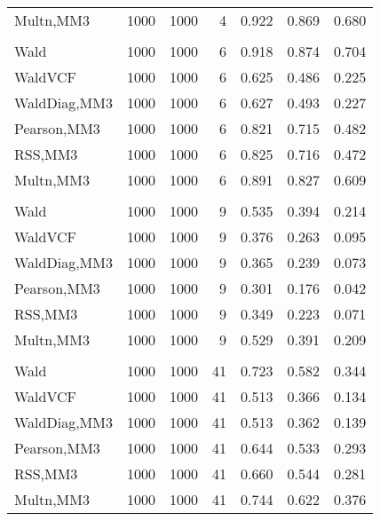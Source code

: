 \documentclass[
]{article}
\begin{document}
\begin{table}[H]
{\begin{tabular}[t]{lrrrrrr}
\hspace{1em}Multn,MM3 & 1000 & 1000 & 4 & 0.922 & 0.869 & 0.680\\
\addlinespace[0.3em]
\multicolumn{7}{l}{\textbf{1F 15V}}\\
\hspace{1em}Wald & 1000 & 1000 & 6 & 0.918 & 0.874 & 0.704\\
\hspace{1em}WaldVCF & 1000 & 1000 & 6 & 0.625 & 0.486 & 0.225\\
\hspace{1em}WaldDiag,MM3 & 1000 & 1000 & 6 & 0.627 & 0.493 & 0.227\\
\hspace{1em}Pearson,MM3 & 1000 & 1000 & 6 & 0.821 & 0.715 & 0.482\\
\hspace{1em}RSS,MM3 & 1000 & 1000 & 6 & 0.825 & 0.716 & 0.472\\
\hspace{1em}Multn,MM3 & 1000 & 1000 & 6 & 0.891 & 0.827 & 0.609\\
\addlinespace[0.3em]
\multicolumn{7}{l}{\textbf{2F 10V}}\\
\hspace{1em}Wald & 1000 & 1000 & 9 & 0.535 & 0.394 & 0.214\\
\hspace{1em}WaldVCF & 1000 & 1000 & 9 & 0.376 & 0.263 & 0.095\\
\hspace{1em}WaldDiag,MM3 & 1000 & 1000 & 9 & 0.365 & 0.239 & 0.073\\
\hspace{1em}Pearson,MM3 & 1000 & 1000 & 9 & 0.301 & 0.176 & 0.042\\
\hspace{1em}RSS,MM3 & 1000 & 1000 & 9 & 0.349 & 0.223 & 0.071\\
\hspace{1em}Multn,MM3 & 1000 & 1000 & 9 & 0.529 & 0.391 & 0.209\\
\addlinespace[0.3em]
\multicolumn{7}{l}{\textbf{3F 15V}}\\
\hspace{1em}Wald & 1000 & 1000 & 41 & 0.723 & 0.582 & 0.344\\
\hspace{1em}WaldVCF & 1000 & 1000 & 41 & 0.513 & 0.366 & 0.134\\
\hspace{1em}WaldDiag,MM3 & 1000 & 1000 & 41 & 0.513 & 0.362 & 0.139\\
\hspace{1em}Pearson,MM3 & 1000 & 1000 & 41 & 0.644 & 0.533 & 0.293\\
\hspace{1em}RSS,MM3 & 1000 & 1000 & 41 & 0.660 & 0.544 & 0.281\\
\hspace{1em}Multn,MM3 & 1000 & 1000 & 41 & 0.744 & 0.622 & 0.376\\
\bottomrule
\end{tabular}}
\endgroup{}
\end{table}
\end{document}
